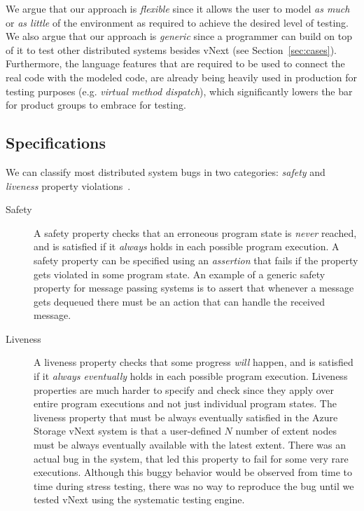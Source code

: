 We argue that our approach is \emph{flexible} since it allows the user to model \emph{as much} or \emph{as little} of the environment as required to achieve the desired level of testing. We also argue that our approach is \emph{generic} since a programmer can build on top of it to test other distributed systems besides vNext (see Section~\ref{sec:cases}). Furthermore, the language features that are required to be used to connect the real code with the modeled code, are already being heavily used in production for testing purposes (e.g. \emph{virtual method dispatch}), which significantly lowers the bar for product groups to embrace \psharp for testing.

\subsection{Specifications}
\label{sec:bg:bugs}

We can classify most distributed system bugs in two categories: \emph{safety} and \emph{liveness} property violations~\cite{lamport1977proving}.

\begin{description}
\item[Safety] A safety property checks that an erroneous program state is \emph{never} reached, and is satisfied if it \emph{always} holds in each possible program execution.
A safety property can be specified using an \emph{assertion} that fails if the property gets violated in some program state. An example of a generic safety property for message passing systems is to assert that whenever a message gets dequeued there must be an action that can handle the received message.

\item[Liveness] A liveness property checks that some progress \emph{will} happen, and is satisfied if it \emph{always eventually} holds in each possible program execution.
Liveness properties are much harder to specify and check since they apply over entire program executions and not just individual program states. The liveness property that must be always eventually satisfied in the Azure Storage vNext system is that a user-defined $N$ number of extent nodes must be always eventually available with the latest extent. There was an actual bug in the system, that led this property to fail for some very rare executions. Although this buggy behavior would be observed from time to time during stress testing, there was no way to reproduce the bug until we tested vNext using the \psharp systematic testing engine.
\end{description}

